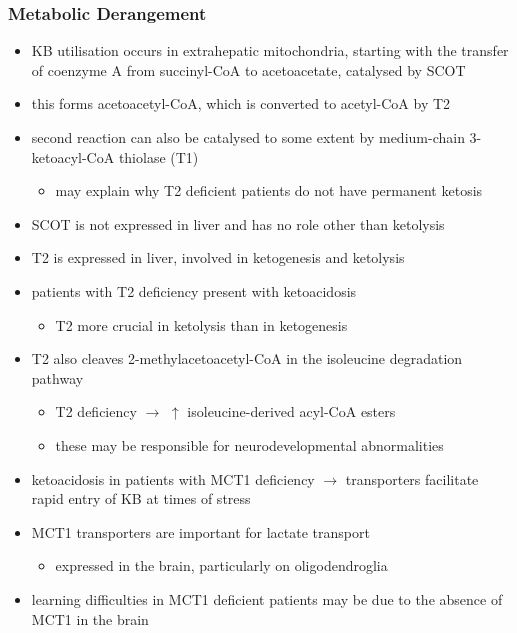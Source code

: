 \documentclass[12pt]{scrartcl}
\begin{document}
\subsubsection{Metabolic Derangement}
\label{sec:org3f0ed33}
\begin{itemize}
\item KB utilisation occurs in extrahepatic mitochondria, starting with
the transfer of coenzyme A from succinyl-CoA to acetoacetate,
catalysed by SCOT


\item this forms acetoacetyl-CoA, which is converted to acetyl-CoA by T2
\item second reaction can also be catalysed to some extent by
medium-chain 3-ketoacyl-CoA thiolase (T1)
\begin{itemize}
\item may explain why T2 deficient patients do not have permanent
ketosis
\end{itemize}

\item SCOT is not expressed in liver and has no role other than
ketolysis
\item T2 is expressed in liver, involved in ketogenesis and ketolysis
\item patients with T2 deficiency present with ketoacidosis
\begin{itemize}
\item T2 more crucial in ketolysis than in ketogenesis
\end{itemize}
\item T2 also cleaves 2-methylacetoacetyl-CoA in the isoleucine
degradation pathway
\begin{itemize}
\item T2 deficiency \(\to\) \(\uparrow\) isoleucine-derived acyl-CoA esters
\item these may be responsible for neurodevelopmental abnormalities
\end{itemize}
\item ketoacidosis in patients with MCT1 deficiency \(\to\) transporters
facilitate rapid entry of KB at times of stress
\item MCT1 transporters are important for lactate transport
\begin{itemize}
\item expressed in the brain, particularly on oligodendroglia
\end{itemize}
\item learning difficulties in MCT1 deficient patients may be due to the
absence of MCT1 in the brain
\end{itemize}
\end{document}
